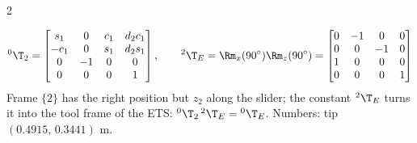 \begin{multicols}{2}
\begin{worked}
\[{}^0\T_2=\begin{bmatrix}s_1&0&c_1&d_2c_1\\-c_1&0&s_1&d_2s_1\\0&-1&0&0\\0&0&0&1\end{bmatrix},\qquad{}^2\T_E=\Rm_x(90^\circ)\Rm_z(90^\circ)=\begin{bmatrix}0&-1&0&0\\0&0&-1&0\\1&0&0&0\\0&0&0&1\end{bmatrix}\]
Frame $\{2\}$ has the right position but $z_2$ along the slider; the constant ${}^2\T_E$ turns it into the tool frame of the ETS: ${}^0\T_2\,{}^2\T_E={}^0\T_E$. Numbers: tip $(0.4915,\,0.3441)$ m. \chk
\end{worked}


\end{multicols}
